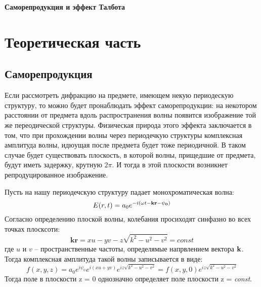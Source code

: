 \documentclass{urticle}
\begin{document}
\begin{center}
    {\bf \Large Саморепродукция и эффект Талбота}
\end{center}

\newpage

\section{Теоретическая часть}
\subsection{Саморепродукция}

    Если рассмотреть дифракцию на предмете, имеющем некую периодескую структуру, то можно будет пронаблюдать эффект саморепродукции: на некотором расстоянии от предмета вдоль распространения волны появится изображение той же переодической структуры. Физическая природа этого эффекта заключается в том, что при прохождении волны через периодечкую структуры комплексная амплитуда волны, идюущая после предмета будет тоже периодичной. В таком случае будет существовать плоскость, в которой волны, прищедшие от предмета, будут иметь задержку, крутную $2\pi$. И тогда в этой плоскости возникнет репродуцированное изображение. 

    Пусть на нашу периодечскую структуру падает монохроматическая волна:
    \begin{equation}
        E(r,t) = a_0 e^{-i(\omega t- \bf{kr} - \psi_0)}
    \end{equation}
    Согласно определению плоской волны, колебания просиходят синфазно во всех точках плосксоти: 
    \begin{equation}
        \textbf{kr} = xu - yv - z\sqrt{k^2-u^2-v^2} = const
    \end{equation}
    где $u$ и $v$ -- пространственные частоты, определямые напрвлением вектора $\bf{k}$. Тогда комплексная амплитуда такой волны записывается в виде:
    \begin{equation}
        f(x,y,z) = a_0 e^{i\psi_0}e^{i(xu+yv)}e^{iz\sqrt{k^2-u^2-v^2}} = f(x,y,0)e^{iz\sqrt{k^2-u^2-v^2}}
    \end{equation}
    Тогда поле в плоскости z = 0 однозначно определяет поле плоскости z = \textit{const}. 
\end{document}
